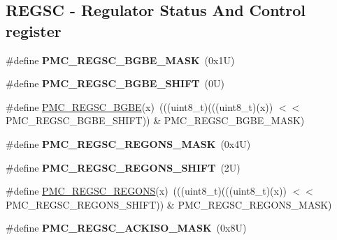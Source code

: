 \subsection*{R\+E\+G\+SC -\/ Regulator Status And Control register}
\begin{DoxyCompactItemize}
\item 
\mbox{\label{group___p_m_c___register___masks_ga98cf5c98c133e20fb620faa6ca29d98e}} 
\#define {\bfseries P\+M\+C\+\_\+\+R\+E\+G\+S\+C\+\_\+\+B\+G\+B\+E\+\_\+\+M\+A\+SK}~(0x1\+U)
\item 
\mbox{\label{group___p_m_c___register___masks_ga2e23aa8155158c86fc53ccd8baccf24d}} 
\#define {\bfseries P\+M\+C\+\_\+\+R\+E\+G\+S\+C\+\_\+\+B\+G\+B\+E\+\_\+\+S\+H\+I\+FT}~(0\+U)
\item 
\#define \mbox{\hyperlink{group___p_m_c___register___masks_gafb37a90d087dbf5bc4c3b654e33d6ef7}{P\+M\+C\+\_\+\+R\+E\+G\+S\+C\+\_\+\+B\+G\+BE}}(x)~(((uint8\+\_\+t)(((uint8\+\_\+t)(x)) $<$$<$ P\+M\+C\+\_\+\+R\+E\+G\+S\+C\+\_\+\+B\+G\+B\+E\+\_\+\+S\+H\+I\+FT)) \& P\+M\+C\+\_\+\+R\+E\+G\+S\+C\+\_\+\+B\+G\+B\+E\+\_\+\+M\+A\+SK)
\item 
\mbox{\label{group___p_m_c___register___masks_gab830f2c82eef6d0db7caab8ee5689ba6}} 
\#define {\bfseries P\+M\+C\+\_\+\+R\+E\+G\+S\+C\+\_\+\+R\+E\+G\+O\+N\+S\+\_\+\+M\+A\+SK}~(0x4\+U)
\item 
\mbox{\label{group___p_m_c___register___masks_ga06b4e6d970f2610a635c92bb1270541d}} 
\#define {\bfseries P\+M\+C\+\_\+\+R\+E\+G\+S\+C\+\_\+\+R\+E\+G\+O\+N\+S\+\_\+\+S\+H\+I\+FT}~(2\+U)
\item 
\#define \mbox{\hyperlink{group___p_m_c___register___masks_ga5c4e1173d8cdf7f0318071b77331fb83}{P\+M\+C\+\_\+\+R\+E\+G\+S\+C\+\_\+\+R\+E\+G\+O\+NS}}(x)~(((uint8\+\_\+t)(((uint8\+\_\+t)(x)) $<$$<$ P\+M\+C\+\_\+\+R\+E\+G\+S\+C\+\_\+\+R\+E\+G\+O\+N\+S\+\_\+\+S\+H\+I\+FT)) \& P\+M\+C\+\_\+\+R\+E\+G\+S\+C\+\_\+\+R\+E\+G\+O\+N\+S\+\_\+\+M\+A\+SK)
\item 
\mbox{\label{group___p_m_c___register___masks_ga35ced6f0f133b2d5892bdcba3e0b2832}} 
\#define {\bfseries P\+M\+C\+\_\+\+R\+E\+G\+S\+C\+\_\+\+A\+C\+K\+I\+S\+O\+\_\+\+M\+A\+SK}~(0x8\+U)

\end{DoxyCompactItemize}
